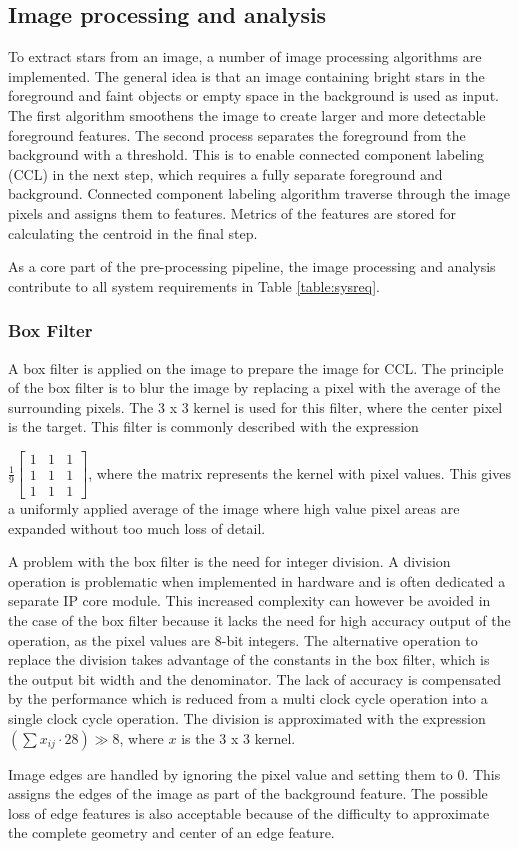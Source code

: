 \documentclass[12pt]{report}
\begin{document}
\subsection{Image processing and analysis}
To extract stars from an image, a number of image processing algorithms are implemented. The general idea is that an image containing bright stars in the foreground and faint objects or empty space in the background is used as input. The first algorithm smoothens the image to create larger and more detectable foreground features. The second process separates the foreground from the background with a threshold. This is to enable connected component labeling (CCL) in the next step, which requires a fully separate foreground and background. Connected component labeling algorithm traverse through the image pixels and assigns them to features. Metrics of the features are stored for calculating the centroid in the final step.
\par
As a core part of the pre-processing pipeline, the image processing and analysis contribute to all system requirements in Table \ref*{table:sysreq}.

\subsubsection{Box Filter}
A box filter is applied on the image to prepare the image for CCL. The principle of the box filter is to blur the image by replacing a pixel with the average of the surrounding pixels. The 3 x 3 kernel is used for this filter, where the center pixel is the target. This filter is commonly described with the expression 
 
$\frac{1}{9}
\begin{bmatrix}
1 & 1 & 1\\
1 & 1 & 1\\
1 & 1 & 1
\end{bmatrix}
$,
where the matrix represents the kernel with pixel values. This gives a uniformly applied average of the image where high value pixel areas are expanded without too much loss of detail.
\par
A problem with the box filter is the need for integer division. A division operation is problematic when implemented in hardware and is often dedicated a separate IP core module. This increased complexity can however be avoided in the case of the box filter because it lacks the need for high accuracy output of the operation, as the pixel values are 8-bit integers. The alternative operation to replace the division takes advantage of the constants in the box filter, which is the output bit width and the denominator. The lack of accuracy is compensated by the performance which is reduced from a multi clock cycle operation into a single clock cycle operation. The division is approximated with the expression
$
(\sum x_{ij} \cdot 28) \gg 8 
$, where $x$ is the 3 x 3 kernel.
\par
Image edges are handled by ignoring the pixel value and setting them to 0. This assigns the edges of the image as part of the background feature. The possible loss of edge features is also acceptable because of the difficulty to approximate the complete geometry and center of an edge feature. 
\end{document}
